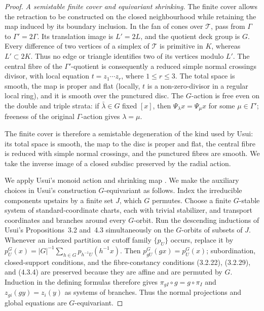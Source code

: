 \documentclass[11pt]{article}
\theoremstyle{definition}
\theoremstyle{remark}
\numberwithin{equation}{section}
\begin{document}
\begin{proof}
\smallskip
\noindent\emph{A semistable finite cover and equivariant shrinking.}
The finite cover allows the retraction to be constructed on the closed
neighbourhood while retaining the map induced by its boundary inclusion.
In the fan of cones over $\mathcal T$, pass
from $\Gamma$ to $\Gamma'=2\Gamma$.  Its translation image is
$L'=2L$, and the quotient deck group is $G$.  Every difference of two
vertices
of a simplex of $\mathcal T$ is primitive in $K$, whereas $L'\subset2K$.
Thus no edge or triangle identifies two of its vertices modulo $L'$.
The central fibre of the $\Gamma'$-quotient is consequently a reduced
simple normal crossings divisor, with local equation
$t=z_1\cdots z_r$, where $1\le r\le3$.
The total space is smooth, the map is proper and flat (locally, $t$ is a
non-zero-divisor in a regular local ring), and it is smooth over the
punctured disc.  The $G$-action is free even on the double and
triple strata: if $\bar\lambda\in G$ fixed $[x]$, then
$\Psi_\lambda x=\Psi_\mu x$ for some $\mu\in\Gamma'$; freeness of the
original $\Gamma$-action gives $\lambda=\mu$.

The finite cover is therefore a semistable degeneration of the kind used by
Usui: its total space is smooth, the map to the disc is proper and flat, the
central fibre is reduced with simple normal crossings, and the punctured
fibres are smooth.  We take the inverse image of a closed subdisc preserved
by the radial action.

We apply Usui's monoid action and shrinking map
\citep[Theorem~5.2 and equations (5.2.5.2), (5.2.5.4), and (5.2.12)]{Usui2001}.
We make the auxiliary choices in Usui's construction $G$-equivariant as
follows.  Index the
irreducible components upstairs by a finite set $J$, which $G$ permutes.
Choose a finite $G$-stable system of standard-coordinate charts, each with
trivial stabilizer, and transport coordinates and branches around every
$G$-orbit.  Run the descending inductions of Usui's
Propositions~3.2 and~4.3 simultaneously on the $G$-orbits of subsets of
$J$.  Whenever an indexed partition or cutoff family
$\{p_U\}$ occurs, replace it by
$p_U^G(x)=|G|^{-1}\sum_{h\in G}p_{h^{-1}U}(h^{-1}x)$.
Then $p_{gU}^G(gx)=p_U^G(x)$; subordination, closed-support conditions,
and the fibre-constancy conditions (3.2.22), (3.2.29), and (4.3.4) are
preserved because they are affine and are permuted by $G$.  Induction in
the defining formulas therefore gives $\pi_{gI}\circ g=g\circ\pi_I$ and
$z_{gi}(gy)=z_i(y)$
as systems of branches.  Thus the normal projections and global equations
are $G$-equivariant.


\end{proof}
\end{document}
